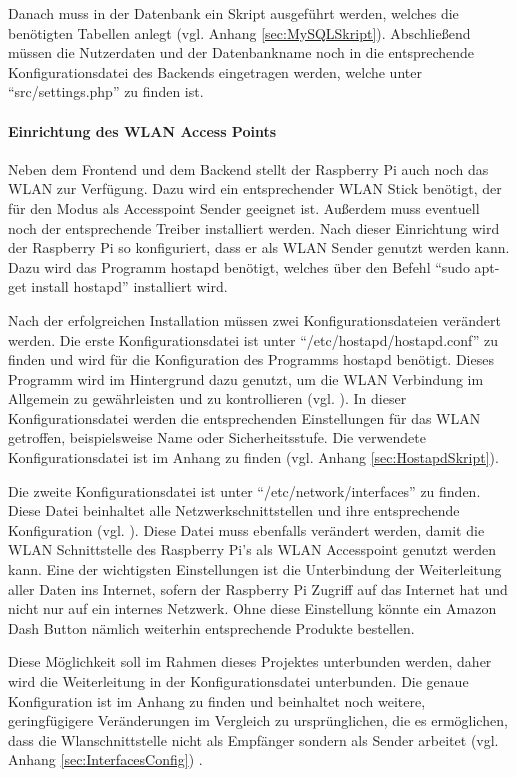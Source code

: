 Danach muss in der Datenbank ein Skript ausgeführt werden, welches die benötigten Tabellen anlegt (vgl. Anhang \ref{sec:MySQLSkript}). Abschließend müssen die Nutzerdaten und der Datenbankname noch in die entsprechende Konfigurationsdatei des Backends eingetragen werden, welche unter ``src/settings.php'' zu finden ist. 

\paragraph{Einrichtung des \ac{WLAN} Access Points}$\;$ \\ 
\label{sec:Einrichtung des WLAN Access Points-1} 
Neben dem Frontend und dem Backend stellt der Raspberry Pi auch noch das \ac{WLAN} zur Verfügung. Dazu wird ein entsprechender \ac{WLAN} Stick benötigt, der für den Modus als Accesspoint Sender geeignet ist. Außerdem muss eventuell noch der entsprechende Treiber installiert werden. Nach dieser Einrichtung wird der Raspberry Pi so konfiguriert, dass er als \ac{WLAN} Sender genutzt werden kann. Dazu wird das Programm hostapd benötigt, welches über den Befehl ``sudo apt-get install hostapd'' installiert wird. 

Nach der erfolgreichen Installation müssen zwei Konfigurationsdateien verändert werden. Die erste Konfigurationsdatei ist unter ``/etc/hostapd/hostapd.conf'' zu finden und wird für die Konfiguration des Programms hostapd benötigt. Dieses Programm wird im Hintergrund dazu genutzt, um die \ac{WLAN} Verbindung im Allgemein zu gewährleisten und zu kontrollieren (vgl. \cite{.o}\cite{.n}). In dieser Konfigurationsdatei werden die entsprechenden Einstellungen für das \ac{WLAN} getroffen, beispielsweise Name oder Sicherheitsstufe. Die verwendete Konfigurationsdatei ist im Anhang zu finden (vgl. Anhang \ref{sec:HostapdSkript}).

Die zweite Konfigurationsdatei ist unter ``/etc/network/interfaces'' zu finden. Diese Datei beinhaltet alle Netzwerkschnittstellen und ihre entsprechende Konfiguration (vgl. \cite{.p}). Diese Datei muss ebenfalls verändert werden, damit die \ac{WLAN} Schnittstelle des Raspberry Pi's als \ac{WLAN} Accesspoint genutzt werden kann. Eine der wichtigsten Einstellungen ist die Unterbindung der Weiterleitung aller Daten ins Internet, sofern der Raspberry Pi Zugriff auf das Internet hat und nicht nur auf ein internes Netzwerk. Ohne diese Einstellung könnte ein Amazon Dash Button nämlich weiterhin entsprechende Produkte bestellen. 

Diese Möglichkeit soll im Rahmen dieses Projektes unterbunden werden, daher wird die Weiterleitung in der Konfigurationsdatei unterbunden. Die genaue Konfiguration ist im Anhang zu finden und beinhaltet noch weitere, geringfügigere Veränderungen im Vergleich zu ursprünglichen, die es ermöglichen, dass die Wlanschnittstelle nicht als Empfänger sondern als Sender arbeitet (vgl. Anhang \ref{sec:InterfacesConfig}) .

